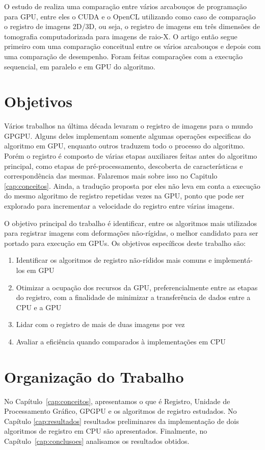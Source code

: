 	O estudo de \cite{membarth2011frameworks} realiza uma comparação entre vários arcabouços de programação para GPU,
entre eles o CUDA e o OpenCL utilizando como caso de comparação o registro de imagens 2D/3D, ou seja, o registro de
imagens em três dimensões de tomografia computadorizada para imagens de raio-X. O artigo então segue primeiro com uma
comparação conceitual entre os vários arcabouços e depois com uma comparação de desempenho. Foram feitas comparações 
com a execução sequencial, em paralelo e em GPU do algoritmo. 
	
\section{Objetivos}
	Vários trabalhos na última década levaram o registro de imagens para o mundo GPGPU. Alguns deles implementam somente
algumas operações especificas do algoritmo em GPU, enquanto outros traduzem todo o processo do algoritmo. Porém o registro é composto de 
várias etapas auxiliares feitas antes do algoritmo principal, como etapas de pré-processamento, descoberta de 
características e correspondência das mesmas. Falaremos mais sobre isso no Capitulo \ref{cap:conceitos}. Ainda, a tradução 
proposta por eles não leva em conta a execução do mesmo algoritmo de registro repetidas vezes na GPU, ponto que pode ser
explorado para incrementar a velocidade do registro entre várias imagens.
	
	O objetivo principal do trabalho é identificar, entre os algoritmos mais utilizados para registrar imagens com 
deformações não-rígidas, o melhor candidato para ser portado para execução em GPUs. Os objetivos específicos deste
trabalho são:

\begin{enumerate}
	\item Identificar os algoritmos de registro não-rídidos mais comuns e implementá-los em GPU
	\item Otimizar a ocupação dos recursos da GPU, preferencialmente entre as etapas do registro, com a finalidade de 
				minimizar a transferência de dados entre a CPU e a GPU
	\item Lidar com o registro de mais de duas imagens por vez
	\item Avaliar a eficiência quando comparados à implementações em CPU
\end{enumerate}

\section{Organização do Trabalho}
\label{sec:organizacao_trabalho}

No Capítulo~\ref{cap:conceitos}, apresentamos o que é Registro, Unidade de Processamento Gráfico, GPGPU e os algoritmos 
de registro estudados. No Capítulo \ref{cap:resultados} resultados preliminares da implementação de dois algoritmos
de registro em CPU são apresentados. Finalmente, no Capítulo~\ref{cap:conclusoes} analisamos os resultados obtidos. 